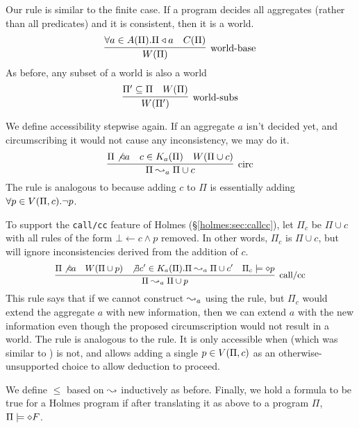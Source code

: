 Our  rule is similar to the finite case.
If a program decides all aggregates (rather than all predicates) and it is consistent, then it is a world.
\[
	\infer[\textrm{world-base}]{\world{\Pi}}{\forall a \in \aggset(\Pi). \Pi \decides a & C(\Pi)}
\]
As before, any subset of a world is also a world
\[
	\infer[\textrm{world-subs}]{\world{\Pi'}}{\Pi' \subseteq \Pi & \world{\Pi}}
\]

We define accessibility stepwise again.
If an aggregate $a$ isn't decided yet, and circumscribing it would not cause any inconsistency, we may do it.
\[
	\infer[\textrm{circ}]{\Pi \stepass_a \Pi \cup c}{\Pi \not \decides a & c \in \circset_a(\Pi) & W(\Pi \cup c)}
\]
The  rule is analogous to  because adding $c$ to $\Pi$ is essentially adding $\forall p \in V(\Pi, c). \neg p$.

To support the \texttt{call/cc} feature of Holmes (\S \ref{holmes:sec:callcc}), let $\Pi_c$ be $\Pi \cup c$ with all rules of the form $\bot \leftarrow c \wedge p$ removed.
In other words, $\Pi_c$ is $\Pi \cup c$, but will ignore inconsistencies derived from the addition of $c$.
\[\small
	\infer[\textrm{call/cc}]{\Pi \stepass_a \Pi \cup p}{\Pi \not \decides a & \world{\Pi \cup p} & \not \exists c' \in \circset_a(\Pi). \Pi \stepass_a \Pi \cup c' & \Pi_c \models \dia p}
\]
This rule says that if we cannot construct $\leadsto_a$ using the  rule, but $\Pi_c$ would extend the aggregate $a$ with new information, then we can extend $a$ with the new information even though the proposed circumscription would not result in a world.
The  rule is analogous to the  rule.
It is only accessible when  (which was similar to ) is not, and allows adding a single $p \in V(\Pi, c)$ as an otherwise-unsupported choice to allow deduction to proceed.

We define $\leq$ based on $\leadsto$ inductively as before.
Finally, we hold a formula to be true for a Holmes program if after translating it as above to a program $\Pi$, $\Pi \models \diamond F$.

